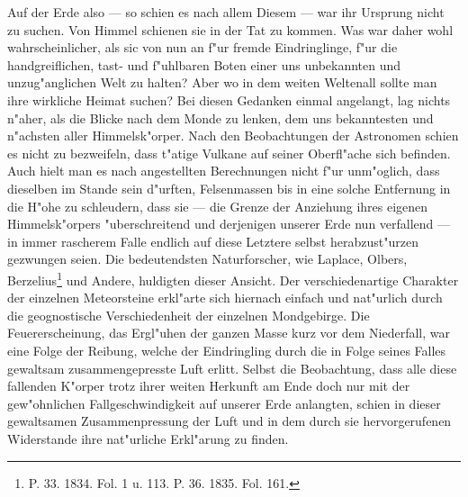 \documentclass[a4paper, 8pt, oneside, polutonikogreek, german]{article}
\begin{document}
Auf der Erde also — so schien es nach allem Diesem — war ihr Ursprung nicht zu suchen. Von Himmel schienen sie in der Tat zu kommen. Was war daher wohl wahrscheinlicher, als sic von nun an f"ur fremde Eindringlinge, f"ur die handgreiflichen, tast- und f"uhlbaren Boten einer uns unbekannten und unzug"anglichen Welt zu halten? Aber wo in dem weiten Weltenall sollte man ihre wirkliche Heimat suchen? Bei diesen Gedanken einmal angelangt, lag nichts n"aher, als die Blicke nach dem Monde zu lenken, dem uns bekanntesten und n"achsten aller Himmelsk"orper. Nach den Beobachtungen der Astronomen schien es nicht zu bezweifeln, dass t"atige Vulkane auf seiner Oberfl"ache sich befinden. Auch hielt man es nach angestellten Berechnungen nicht f"ur unm"oglich, dass dieselben im Stande sein d"urften, Felsenmassen bis in eine solche Entfernung in die H"ohe zu schleudern, dass sie — die Grenze der Anziehung ihres eigenen Himmelsk"orpers "uberschreitend und derjenigen unserer Erde nun verfallend — in immer rascherem Falle endlich auf diese Letztere selbst herabzust"urzen gezwungen seien. Die bedeutendsten Naturforscher, wie Laplace, Olbers, Berzelius\footnote{P. 33. 1834. Fol. 1 u. 113. P. 36. 1835. Fol. 161.} und Andere, huldigten dieser Ansicht. Der verschiedenartige Charakter der einzelnen Meteorsteine erkl"arte sich hiernach einfach und nat"urlich durch die geognostische Verschiedenheit der einzelnen Mondgebirge. Die Feuererscheinung, das Ergl"uhen der ganzen Masse kurz vor dem Niederfall, war eine Folge der Reibung, welche der Eindringling durch die in Folge seines Falles gewaltsam zusammengepresste Luft erlitt. Selbst die Beobachtung, dass alle diese fallenden K"orper trotz ihrer weiten Herkunft am Ende doch nur mit der gew"ohnlichen Fallgeschwindigkeit auf unserer Erde anlangten, schien in dieser gewaltsamen Zusammenpressung der Luft und in dem durch sie hervorgerufenen Widerstande ihre nat"urliche Erkl"arung zu finden.
\end{document}
